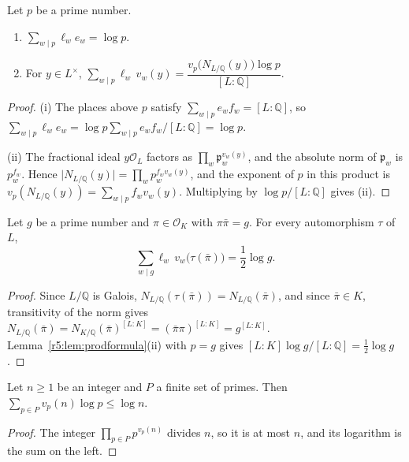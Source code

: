 \begin{lemma}\label{r5:lem:prodformula}
Let $p$ be a prime number.
\begin{enumerate}
\item[(i)] $\sum_{w\mid p}\ell_we_w=\log p$.
\item[(ii)] For $y\in L^\times$, $\sum_{w\mid p}\ell_w\,v_w(y)=\dfrac{v_p\big(N_{L/\mathbb Q}(y)\big)\log p}{[L:\mathbb Q]}$.
\end{enumerate}
\end{lemma}

\begin{proof}
(i) The places above $p$ satisfy $\sum_{w\mid p}e_wf_w=[L:\mathbb Q]$, so $\sum_{w\mid p}\ell_we_w=\log p\sum_{w\mid p}e_wf_w/[L:\mathbb Q]=\log p$.

(ii) The fractional ideal $y\mathcal O_L$ factors as $\prod_w\mathfrak p_w^{v_w(y)}$, and the absolute norm of $\mathfrak p_w$ is $p_w^{f_w}$. Hence $\lvert N_{L/\mathbb Q}(y)\rvert=\prod_wp_w^{f_wv_w(y)}$, and the exponent of $p$ in this product is $v_p(N_{L/\mathbb Q}(y))=\sum_{w\mid p}f_wv_w(y)$. Multiplying by $\log p/[L:\mathbb Q]$ gives (ii).
\end{proof}

\begin{lemma}\label{r5:lem:halfnorm}
Let $g$ be a prime number and $\pi\in\mathcal O_K$ with $\pi\bar\pi=g$. For every automorphism $\tau$ of $L$,
\[
\sum_{w\mid g}\ell_w\,v_w\big(\tau(\bar\pi)\big)=\frac12\log g .
\]
\end{lemma}

\begin{proof}
Since $L/\mathbb Q$ is Galois, $N_{L/\mathbb Q}(\tau(\bar\pi))=N_{L/\mathbb Q}(\bar\pi)$, and since $\bar\pi\in K$, transitivity of the norm gives $N_{L/\mathbb Q}(\bar\pi)=N_{K/\mathbb Q}(\bar\pi)^{[L:K]}=(\bar\pi\pi)^{[L:K]}=g^{[L:K]}$. Lemma~\ref{r5:lem:prodformula}(ii) with $p=g$ gives $[L:K]\log g/[L:\mathbb Q]=\frac12\log g$.
\end{proof}

\begin{lemma}\label{r5:lem:vallog}
Let $n\ge1$ be an integer and $P$ a finite set of primes. Then $\sum_{p\in P}v_p(n)\log p\le\log n$.
\end{lemma}

\begin{proof}
The integer $\prod_{p\in P}p^{v_p(n)}$ divides $n$, so it is at most $n$, and its logarithm is the sum on the left.
\end{proof}

